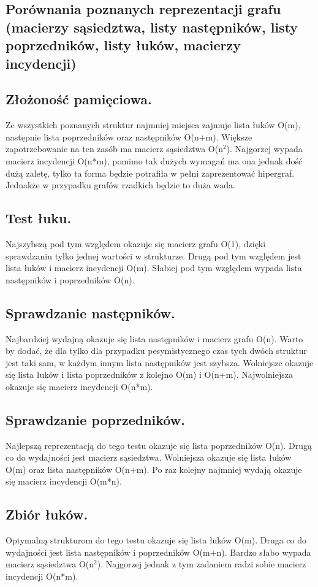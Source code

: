 \documentclass[polish,polish,a4paper]{article}
\begin{document}
\begin{spacing}{1.25}
\section{Porównania poznanych reprezentacji grafu (macierzy sąsiedztwa, listy następników, listy poprzedników, listy łuków, macierzy incydencji)}



\subsection{Złożoność pamięciowa.}
Ze wszystkich poznanych struktur najmniej miejsca zajmuje lista łuków O(m), następnie lista poprzedników oraz następników O(n+m). Większe zapotrzebowanie na ten zasób ma macierz sąsiedztwa O(n$^2$). Najgorzej wypada macierz incydencji O(n*m), pomimo tak dużych wymagań ma ona jednak dość dużą zaletę, tylko ta forma będzie potrafiła w pełni zaprezentować hipergraf. Jednakże w przypadku grafów rzadkich będzie to duża wada.

\subsection{Test łuku.}
Najszybszą pod tym względem okazuje się macierz grafu O(1), dzięki sprawdzaniu tylko jednej wartości w strukturze. Drugą pod tym względem jest lista łuków i macierz incydencji O(m). Słabiej pod tym względem wypada lista następników i poprzedników O(n). 

\subsection{Sprawdzanie następników.}
Najbardziej wydajną okazuje się lista następników i macierz grafu O(n). Warto by dodać, że dla tylko dla przypadku pesymistycznego czas tych dwóch struktur jest taki sam, w każdym innym lista następników jest szybsza. Wolniejsze okazuje się lista łuków i lista poprzedników z kolejno O(m) i O(n+m). Najwolniejsza okazuje się macierz incydencji O(n*m).

\subsection{Sprawdzanie poprzedników.}
Najlepszą reprezentacją do tego testu okazuje się lista poprzedników O(n). Drugą co do wydajności jest macierz sąsiedztwa. Wolniejsza okazuje się lista łuków O(m) oraz lista następników O(n+m). Po raz kolejny najmniej wydają okazuje się macierz incydencji O(m*n).

\subsection{Zbiór łuków.}
Optymalną strukturom do tego testu okazuje się lista łuków O(m).  Druga co do  wydajności jest lista następników i poprzedników O(m+n). Bardzo słabo wypada macierz sąsiedztwa O(n$^2$). Najgorzej jednak z tym zadaniem radzi sobie macierz incydencji O(n*m).


\end{spacing}
	\newpage
	\tableofcontents
\end{document}
